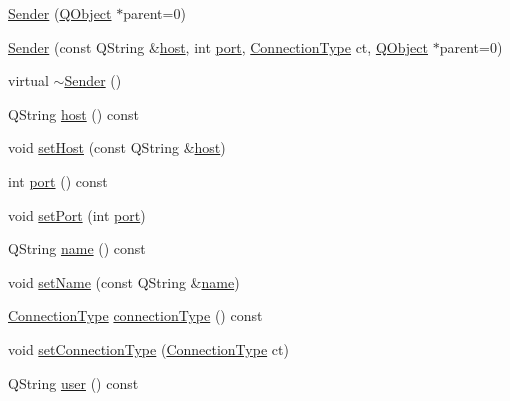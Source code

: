 \begin{DoxyCompactItemize}
\item 
\hyperlink{class_simple_mail_1_1_sender_afbe94a9a42b0101deb08204393ec9669}{Sender} (\hyperlink{class_q_object}{Q\+Object} $\ast$parent=0)
\item 
\hyperlink{class_simple_mail_1_1_sender_a120ee6620d9f22b5c008b27743d03a6d}{Sender} (const Q\+String \&\hyperlink{class_simple_mail_1_1_sender_a688b0cf38532aa73fa943fa4a8d9f797}{host}, int \hyperlink{class_simple_mail_1_1_sender_a9c30e23e4b14333276af1a8b265ccb3c}{port}, \hyperlink{class_simple_mail_1_1_sender_a89e6a9572b306441237f6b6635729d1a}{Connection\+Type} ct, \hyperlink{class_q_object}{Q\+Object} $\ast$parent=0)
\item 
virtual \hyperlink{class_simple_mail_1_1_sender_a99dd9c6aa7d546320d619aca9067fdc6}{$\sim$\+Sender} ()
\item 
Q\+String \hyperlink{class_simple_mail_1_1_sender_a688b0cf38532aa73fa943fa4a8d9f797}{host} () const
\item 
void \hyperlink{class_simple_mail_1_1_sender_a18c47159817fafe9dd3f75855028f70a}{set\+Host} (const Q\+String \&\hyperlink{class_simple_mail_1_1_sender_a688b0cf38532aa73fa943fa4a8d9f797}{host})
\item 
int \hyperlink{class_simple_mail_1_1_sender_a9c30e23e4b14333276af1a8b265ccb3c}{port} () const
\item 
void \hyperlink{class_simple_mail_1_1_sender_a42eacd78ed9bef0f77215bce72cafe2d}{set\+Port} (int \hyperlink{class_simple_mail_1_1_sender_a9c30e23e4b14333276af1a8b265ccb3c}{port})
\item 
Q\+String \hyperlink{class_simple_mail_1_1_sender_ab329650eae52416579e4ed1bb90d49e4}{name} () const
\item 
void \hyperlink{class_simple_mail_1_1_sender_a02d30b604180e3502d6c773751a6c1e6}{set\+Name} (const Q\+String \&\hyperlink{class_simple_mail_1_1_sender_ab329650eae52416579e4ed1bb90d49e4}{name})
\item 
\hyperlink{class_simple_mail_1_1_sender_a89e6a9572b306441237f6b6635729d1a}{Connection\+Type} \hyperlink{class_simple_mail_1_1_sender_a044468efe3bafa577a3039b997a4ae23}{connection\+Type} () const
\item 
void \hyperlink{class_simple_mail_1_1_sender_a879bee44b1e7afed564c82b81261a9b1}{set\+Connection\+Type} (\hyperlink{class_simple_mail_1_1_sender_a89e6a9572b306441237f6b6635729d1a}{Connection\+Type} ct)
\item 
Q\+String \hyperlink{class_simple_mail_1_1_sender_a70ce2ab650d894c40be88d82bd327c3b}{user} () const

\end{DoxyCompactItemize}
